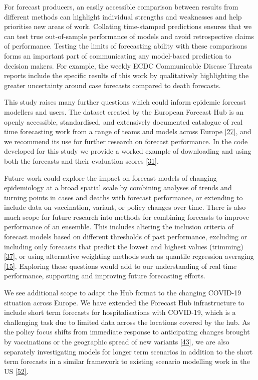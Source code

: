 \documentclass[
]{article}
\begin{document}
For forecast producers, an easily accessible comparison between results from different methods can highlight individual strengths and weaknesses and help prioritise new areas of work. Collating time-stamped predictions ensures that we can test true out-of-sample performance of models and avoid retrospective claims of performance. Testing the limits of forecasting ability with these comparisons forms an important part of communicating any model-based prediction to decision makers. For example, the weekly ECDC Communicable Disease Threats reports include the specific results of this work by qualitatively highlighting the greater uncertainty around case forecasts compared to death forecasts.

This study raises many further questions which could inform epidemic forecast modellers and users. The dataset created by the European Forecast Hub is an openly accessible, standardised, and extensively documented catalogue of real time forecasting work from a range of teams and models across Europe \protect\hyperlink{ref-europeancovid-19forecasthubEuropeanCovid19Forecast}{{[}27{]}}, and we recommend its use for further research on forecast performance. In the code developed for this study we provide a worked example of downloading and using both the forecasts and their evaluation scores \protect\hyperlink{ref-PredictivePerformanceMultimodel2022}{{[}31{]}}.

Future work could explore the impact on forecast models of changing epidemiology at a broad spatial scale by combining analyses of trends and turning points in cases and deaths with forecast performance, or extending to include data on vaccination, variant, or policy changes over time. There is also much scope for future research into methods for combining forecasts to improve performance of an ensemble. This includes altering the inclusion criteria of forecast models based on different thresholds of past performance, excluding or including only forecasts that predict the lowest and highest values (trimming) \protect\hyperlink{ref-taylorCombiningProbabilisticForecasts2021}{{[}37{]}}, or using alternative weighting methods such as quantile regression averaging \protect\hyperlink{ref-funkShorttermForecastsInform2020}{{[}15{]}}. Exploring these questions would add to our understanding of real time performance, supporting and improving future forecasting efforts.

We see additional scope to adapt the Hub format to the changing COVID-19 situation across Europe. We have extended the Forecast Hub infrastructure to include short term forecasts for hospitalisations with COVID-19, which is a challenging task due to limited data across the locations covered by the hub. As the policy focus shifts from immediate response to anticipating changes brought by vaccinations or the geographic spread of new variants \protect\hyperlink{ref-europeancentrefordiseasepreventionandcontrolOverviewImplementationCOVID192021}{{[}43{]}}, we are also separately investigating models for longer term scenarios in addition to the short term forecasts in a similar framework to existing scenario modelling work in the US \protect\hyperlink{ref-borcheringModelingFutureCOVID192021}{{[}52{]}}.
\end{document}
